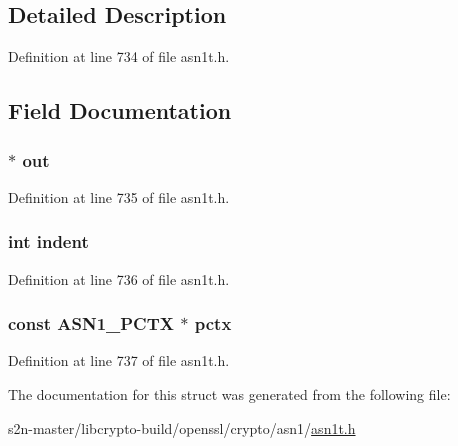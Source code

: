 \subsection{Detailed Description}


Definition at line 734 of file asn1t.\+h.



\subsection{Field Documentation}
\subsubsection[{\texorpdfstring{out}{out}}]{ $\ast$ out}\hypertarget{struct_a_s_n1___p_r_i_n_t___a_r_g__st_a05bc032abf108b32fc96d54922811784}{}\label{struct_a_s_n1___p_r_i_n_t___a_r_g__st_a05bc032abf108b32fc96d54922811784}


Definition at line 735 of file asn1t.\+h.

\subsubsection[{\texorpdfstring{indent}{indent}}]{\setlength{\rightskip}{0pt plus 5cm}int indent}\hypertarget{struct_a_s_n1___p_r_i_n_t___a_r_g__st_a913a30aaae68bab9c263fd5208679335}{}\label{struct_a_s_n1___p_r_i_n_t___a_r_g__st_a913a30aaae68bab9c263fd5208679335}


Definition at line 736 of file asn1t.\+h.

\subsubsection[{\texorpdfstring{pctx}{pctx}}]{\setlength{\rightskip}{0pt plus 5cm}const {\bf A\+S\+N1\+\_\+\+P\+C\+TX} $\ast$ pctx}\hypertarget{struct_a_s_n1___p_r_i_n_t___a_r_g__st_a537aed2182aa0dfd83321156bd167c3d}{}\label{struct_a_s_n1___p_r_i_n_t___a_r_g__st_a537aed2182aa0dfd83321156bd167c3d}


Definition at line 737 of file asn1t.\+h.



The documentation for this struct was generated from the following file\+:\begin{DoxyCompactItemize}
\item 
s2n-\/master/libcrypto-\/build/openssl/crypto/asn1/\hyperlink{crypto_2asn1_2asn1t_8h}{asn1t.\+h}\end{DoxyCompactItemize}

